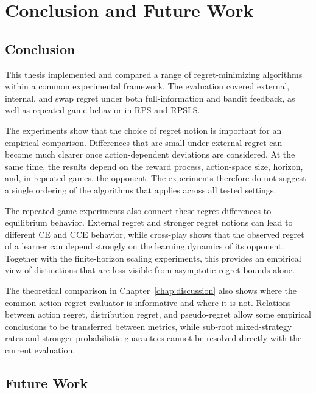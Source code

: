 
\chapter{Conclusion and Future Work}
\label{chap:conclusion}

\section{Conclusion}

This thesis implemented and compared a range of regret-minimizing algorithms
within a common experimental framework. The evaluation covered external,
internal, and swap regret under both full-information and bandit feedback, as
well as repeated-game behavior in RPS and RPSLS.

The experiments show that the choice of regret notion is important for an
empirical comparison. Differences that are small under external regret can
become much clearer once action-dependent deviations are considered. At the
same time, the results depend on the reward process, action-space size,
horizon, and, in repeated games, the opponent. The experiments therefore do
not suggest a single ordering of the algorithms that applies across all tested
settings.

The repeated-game experiments also connect these regret differences to
equilibrium behavior. External regret and stronger regret notions can lead to
different CE and CCE behavior, while cross-play shows that the observed regret
of a learner can depend strongly on the learning dynamics of its opponent.
Together with the finite-horizon scaling experiments, this provides an
empirical view of distinctions that are less visible from asymptotic regret
bounds alone.

The theoretical comparison in Chapter~\ref{chap:discussion} also shows where
the common action-regret evaluator is informative and where it is not.
Relations between action regret, distribution regret, and pseudo-regret allow
some empirical conclusions to be transferred between metrics, while
sub-root mixed-strategy rates and stronger probabilistic guarantees cannot be
resolved directly with the current evaluation.

\section{Future Work}

